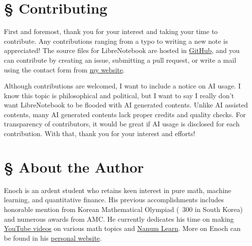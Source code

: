 \documentclass[../main.tex]{subfiles}
\begin{document}
\section*{\S\! Contributing}

First and foremost, thank you for your interest and taking your time
to contribute. Any contributions ranging from a typo to writing a new
note is appreciated! The source files for LibreNotebook are hosted
in \href{https://github.com/enochness/LibreNotebook}{GitHub},
and you can contribute by creating an issue, submitting a pull
request, or write a mail using the contact form from
\href{https://enochyu.com#contact}{my website}.

Although contributions are welcomed, I want to include a notice on
AI usage. I know this topic is philosophical and political,
but I want to say I really don't want LibreNotebook to be flooded with
AI generated contents. Unlike AI assisted contents, many AI generated
contents lack proper credits and quality checks. For transparency of
contributors, it would be great if AI usage is disclosed for each
contribution. With that, thank you for your interest and efforts!

\section*{\S\! About the Author}

Enoch is an ardent student who retains keen interest in pure math,
machine learning, and quantitative finance. His previous
accomplishments includes honorable mention from Korean Mathematical
Olympiad (~300 in South Korea) and numerous awards from AMC.
He currently dedicates his time on making
\href{https://www.youtube.com/@enochness}{YouTube videos}
on various math topics and
\href{https://nanumlearn.enochyu.com}{Nanum Learn}. More on Enoch can
be found in his \href{https://enochyu.com}{personal website}.
\end{document}
